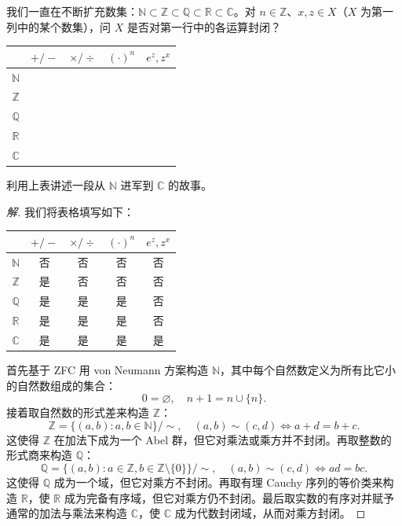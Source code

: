 \documentclass[11pt,a4paper]{article}
\newcommand{\R}{\mathbb{R}}
\newcommand{\C}{\mathbb{C}}
\newcommand{\Q}{\mathbb{Q}}
\newcommand{\Z}{\mathbb{Z}}
\newcommand{\N}{\mathbb{N}}
\theoremstyle{definition}
\newenvironment{solution}{\begin{proof}[解]}{\end{proof}}
\begin{document}
我们一直在不断扩充数集：$\mathbb{N} \subset \mathbb{Z} \subset \mathbb{Q} \subset \mathbb{R} \subset \mathbb{C}$。对 $n \in \mathbb{Z}$、$x, z \in X$（$X$ 为第一列中的某个数集），问 $X$ 是否对第一行中的各运算封闭？
\begin{center}
  \begin{tabular}{|c|c|c|c|c|}
    \hline
    & $+/-$ & $\times/\div$ & $(\cdot)^n$ & $e^z, z^x$ \\ \hline
    $\mathbb{N}$ & & & & \\ \hline
    $\mathbb{Z}$ & & & & \\ \hline
    $\mathbb{Q}$ & & & & \\ \hline
    $\mathbb{R}$ & & & & \\ \hline
    $\mathbb{C}$ & & & & \\ \hline
  \end{tabular}
\end{center}
利用上表讲述一段从 $\mathbb{N}$ 进军到 $\mathbb{C}$ 的故事。

\begin{solution}
我们将表格填写如下：
\begin{center}
  \begin{tabular}{|c|c|c|c|c|}
    \hline
    & $+/-$ & $\times/\div$ & $(\cdot)^n$ & $e^z, z^x$ \\ \hline
    $\mathbb{N}$ & 否 & 否 & 否 & 否 \\ \hline
    $\mathbb{Z}$ & 是 & 否 & 否 & 否 \\ \hline
    $\mathbb{Q}$ & 是 & 是 & 是 & 否 \\ \hline
    $\mathbb{R}$ & 是 & 是 & 是 & 否 \\ \hline
    $\mathbb{C}$ & 是 & 是 & 是 & 是 \\ \hline
  \end{tabular}
\end{center}

首先基于 ZFC 用 von Neumann 方案构造 $\N$，其中每个自然数定义为所有比它小的自然数组成的集合：
\[
  0 = \varnothing, \quad n + 1 = n \cup \{n\}.
\]
接着取自然数的形式差来构造 $\Z$：
\[
  \Z = \{(a, b) : a, b \in \N\} / \sim, \quad (a, b) \sim (c, d)
  \iff a + d = b + c.
\]
这使得 $\Z$ 在加法下成为一个 Abel 群，但它对乘法或乘方并不封闭。再取整数的形式商来构造 $\Q$：
\[
  \Q = \{(a, b) : a \in \Z, b \in \Z \setminus \{0\}\} / \sim,
  \quad (a, b) \sim (c, d) \iff ad = bc.
\]
这使得 $\Q$ 成为一个域，但它对乘方不封闭。再取有理 Cauchy 序列的等价类来构造 $\R$，使 $\R$ 成为完备有序域，但它对乘方仍不封闭。最后取实数的有序对并赋予通常的加法与乘法来构造 $\C$，使 $\C$ 成为代数封闭域，从而对乘方封闭。
\end{solution}
\end{document}
